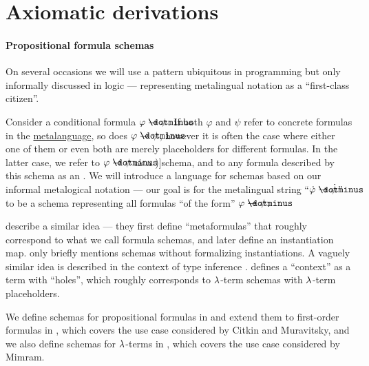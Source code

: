 \section{Axiomatic derivations}\label{sec:axiomatic_derivations}

\paragraph{Propositional formula schemas}

\begin{concept}\label{con:schemas_and_instances}
  On several occasions we will use a pattern ubiquitous in programming but only informally discussed in logic --- representing metalingual notation as a \enquote{first-class citizen}.

  Consider a conditional formula \( \varphi \synimplies \psi \). If both \( \varphi \) and \( \psi \) refer to concrete formulas in the \hyperref[con:metalanguage]{metalanguage}, so does \( \varphi \synimplies \psi \), however it is often the case where either one of them or even both are merely placeholders for different formulas. In the latter case, we refer to \( \varphi \synimplies \psi \) as a \term[ru=схема (формул) (\cite[20]{Эдельман1975Логика})]{schema}, and to any formula described by this schema as an . We will introduce a language for schemas based on our informal metalogical notation --- our goal is for the metalingual string \enquote{\( \syn\varphi \synimplies \syn\psi \)} to be a schema representing all formulas \enquote{of the form} \( \varphi \synimplies \psi \).

   describe a similar idea --- they first define \enquote{metaformulas} that roughly correspond to what we call formula schemas, and later define an instantiation map.  only briefly mentions schemas without formalizing instantiations. A vaguely similar idea is described in the context of type inference .  defines a \enquote{context} as a term with \enquote{holes}, which roughly corresponds to \( \mathrm{\lambda} \)-term schemas with \( \mathrm{\lambda} \)-term placeholders.

  We define schemas for propositional formulas in  and extend them to first-order formulas in , which covers the use case considered by Citkin and Muravitsky, and we also define schemas for \( \mathrm{\lambda} \)-terms in , which covers the use case considered by Mimram.
\end{concept}

